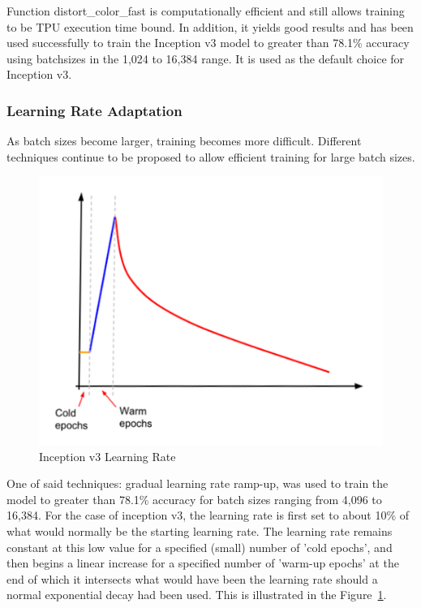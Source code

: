 \documentclass[14pt]{report}
\begin{document}
				Function distort\_color\_fast is computationally efficient and still allows training to be TPU execution time bound. In addition, it yields good results and has been used successfully to train the Inception v3 model to greater than 78.1\% accuracy using batchsizes in the 1,024 to 16,384 range. It is used as the default choice for Inception v3.\\

			\subsubsection{Learning Rate Adaptation}
				As batch sizes become larger, training becomes more difficult. Different techniques continue to be proposed to allow efficient training for large batch sizes.\\
				\begin{figure}[h]
					\includegraphics[width=\textwidth]{EpochIncep.png}
					\centering
					\caption{Inception v3 Learning Rate}
					\label{fig:EpochIncep}
				\end{figure}

				One of said techniques: gradual learning rate ramp-up, was used to train the model to greater than 78.1\% accuracy for batch sizes ranging from 4,096 to 16,384. For the case of inception v3, the learning rate is first set to about 10\% of what would normally be the starting learning rate. The learning rate remains constant at this low value for a specified (small) number of 'cold epochs', and then begins a linear increase for a specified number of 'warm-up epochs' at the end of which it intersects what would have been the learning rate should a normal exponential decay had been used. This is illustrated in the Figure~\ref{fig:EpochIncep}.\\
\end{document}
